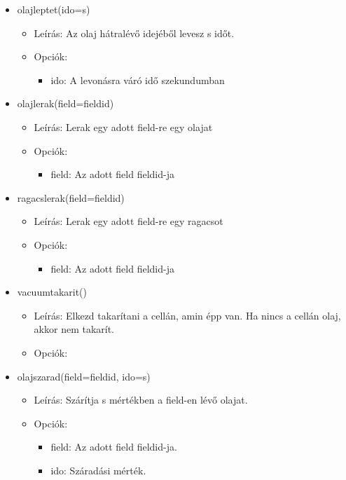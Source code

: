 \begin{itemize}
    \item olajleptet(ido=s)
    \begin{itemize}
    	\item Leírás: Az olaj hátralévő idejéből levesz s időt.
    	\item Opciók: 
    	\begin{itemize}
    		\item ido: A levonásra váró idő szekundumban
    	\end{itemize}	
    \end{itemize}
    
    \item olajlerak(field=fieldid)
    \begin{itemize}
       	\item Leírás: Lerak egy adott field-re egy olajat
       	\item Opciók: 
       	\begin{itemize}
       		\item field: Az adott field fieldid-ja
       	\end{itemize}	
    \end{itemize}
    
    \item ragacslerak(field=fieldid)
    \begin{itemize}
    	\item Leírás: Lerak egy adott field-re egy ragacsot
    	\item Opciók: 
    	\begin{itemize}
    		\item field: Az adott field fieldid-ja
    	\end{itemize}	
    \end{itemize}    
    
    \item vacuumtakarit()
    \begin{itemize}
    	\item Leírás: Elkezd takarítani a cellán, amin épp van. Ha nincs a cellán olaj, akkor nem takarít.
    	\item Opciók: 
    \end{itemize}    
    
    \item olajszarad(field=fieldid, ido=s)
    \begin{itemize}
    	\item Leírás: Szárítja s mértékben a field-en lévő olajat.
    	\item Opciók: 
    	\begin{itemize}
    		\item field: Az adott field fieldid-ja.
	    	\item ido: Száradási mérték.
    	\end{itemize}	
    \end{itemize}   
    

\end{itemize}
